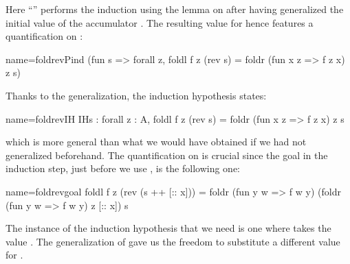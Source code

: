 Here ``'' performs the induction using the
 lemma on  after having generalized the initial value of
the accumulator . The resulting value for  hence
features a quantification on :

\begin{coq}{name=foldrevPind}{}
(fun s => forall z, foldl f z (rev s) = foldr (fun x z => f z x) z s)
\end{coq}

%
%
Thanks to the generalization, the induction
hypothesis  states:

\begin{coq}{name=foldrevIH}{}
IHs : forall z : A, foldl f z (rev s) = foldr (fun x z => f z x) z s
\end{coq}
which is more general than what we would have obtained if we had not
generalized  beforehand.
The quantification on  is crucial since the goal in the induction step,
just before we use , is the following one:

\begin{coq}{name=foldrevgoal}{}
foldl f z (rev (s ++ [:: x])) =
  foldr (fun y w => f w y) (foldr (fun y w => f w y) z [:: x]) s
\end{coq}

The instance of the induction hypothesis that we need is
one where  takes the value .
The generalization of  gave us the freedom to substitute a
different value for .

